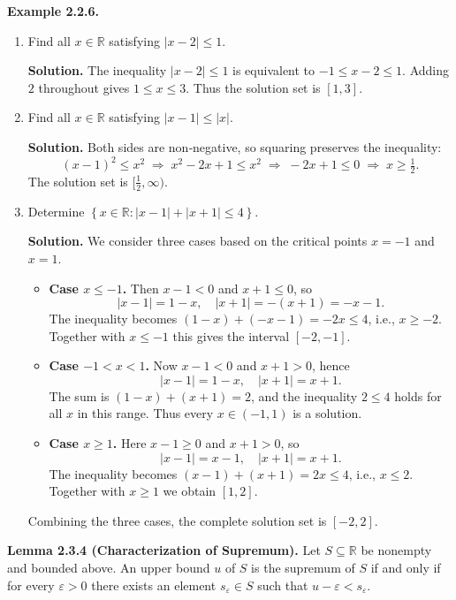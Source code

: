 \documentclass[12pt,a4paper]{article}
\theoremstyle{definition}
\newcommand{\R}{\mathbb{R}}
\newcommand{\eps}{\varepsilon}
\newcommand{\abs}[1]{\left\lvert#1\right\rvert}
\newcommand{\set}[1]{\left\{#1\right\}}
\begin{document}
\textbf{Example 2.2.6.}
\begin{enumerate}[label=(\alph*)]
    \item Find all \(x\in\R\) satisfying \(\abs{x-2}\le1\).
    
    \textbf{Solution.} The inequality \(\abs{x-2}\le1\) is equivalent to \(-1\le x-2\le1\). Adding \(2\) throughout gives \(1\le x\le3\). Thus the solution set is \([1,3]\).

    \item Find all \(x\in\R\) satisfying \(\abs{x-1}\le\abs{x}\).

    \textbf{Solution.} Both sides are non‑negative, so squaring preserves the inequality:
    \[
    (x-1)^2\le x^2\;\Longrightarrow\; x^2-2x+1\le x^2\;\Longrightarrow\; -2x+1\le0\;\Longrightarrow\; x\ge\tfrac12.
    \]
    The solution set is \([\tfrac12,\infty)\).

    \item Determine \(\set{x\in\R : \abs{x-1}+\abs{x+1}\le4}\).

    \textbf{Solution.} We consider three cases based on the critical points \(x=-1\) and \(x=1\).

    \begin{itemize}
        \item \textbf{Case \(x\le-1\).} Then \(x-1<0\) and \(x+1\le0\), so
        \[
        \abs{x-1}=1-x,\quad \abs{x+1}=-(x+1)=-x-1.
        \]
        The inequality becomes \((1-x)+(-x-1)=-2x\le4\), i.e., \(x\ge-2\). Together with \(x\le-1\) this gives the interval \([-2,-1]\).

        \item \textbf{Case \(-1<x<1\).} Now \(x-1<0\) and \(x+1>0\), hence
        \[
        \abs{x-1}=1-x,\quad \abs{x+1}=x+1.
        \]
        The sum is \((1-x)+(x+1)=2\), and the inequality \(2\le4\) holds for all \(x\) in this range. Thus every \(x\in(-1,1)\) is a solution.

        \item \textbf{Case \(x\ge1\).} Here \(x-1\ge0\) and \(x+1>0\), so
        \[
        \abs{x-1}=x-1,\quad \abs{x+1}=x+1.
        \]
        The inequality becomes \((x-1)+(x+1)=2x\le4\), i.e., \(x\le2\). Together with \(x\ge1\) we obtain \([1,2]\).
    \end{itemize}
    Combining the three cases, the complete solution set is \([-2,2]\).
\end{enumerate}

\textbf{Lemma 2.3.4 (Characterization of Supremum).} Let \(S\subseteq\R\) be nonempty and bounded above. An upper bound \(u\) of \(S\) is the supremum of \(S\) if and only if for every \(\eps>0\) there exists an element \(s_\eps\in S\) such that \(u-\eps < s_\eps\).
\end{document}
